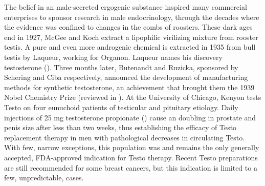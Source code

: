 \documentclass[12pt,english]{report}\usepackage[]{graphicx}\usepackage[]{color}
\begin{document}
The belief in an male-secreted ergogenic substance inspired many commercial
enterprises to sponsor research in male endocrinology, through the
decades where the evidence was confined to changes in the combs of
roosters. These dark ages end in 1927, McGee and Koch extract a lipophilic
virilizing mixture from rooster testis\citep{gallagher1929testicular,mcgee1928development}.
A pure and even more androgenic chemical is extracted in 1935 from
bull testis by Laqueur, working for Organon\citep{david1935uber}.
Laqueur names his discovery testosterone ().
Three months later, Butenandt and Ruzicka, sponsored by Schering and
Ciba respectively, announced the development of manufacturing methods
for synthetic testosterone, an achievement that brought them the 1939
Nobel Chemistry Prize (reviewed in \citep{hoberman1995history}).
At the University of Chicago, Kenyon tests Testo on four eunuchoid
patients of testicular and pituitary etiology. Daily injections of
25 mg testosterone propionate ()
cause an doubling in prostate and penis size\citep{kenyon1938effect}
after less than two weeks, thus establishing the efficacy of Testo
replacement therapy in men with pathological decreases in circulating
Testo. With few, narrow exceptions, this population was and remains
the only generally accepted, FDA-approved indication for Testo therapy\citep{auxiliumpharmaceuticalsinc.2014testim,endopharmaceuticalssolutionsinc.2014delatestryl,unimed2004androgel}.
Recent Testo preparations are still recommended for some breast cancers,
but this indication is limited to a few, unpredictable, cases.
\end{document}
